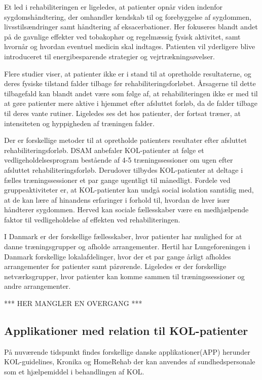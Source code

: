 Et led i rehabiliteringen er ligeledes, at patienter opnår viden indenfor sygdomshåndtering, der omhandler kendskab til og forebyggelse af sygdommen, livsstilsændringer samt håndtering af eksacerbationer.\cite{McCarthy2015,Sundhedsstyrelsen2015} Her fokuseres blandt andet på de gavnlige effekter ved tobakophør og regelmæssig fysisk aktivitet, samt hvornår og hvordan eventuel medicin skal indtages. Patienten vil yderligere blive introduceret til energibesparende strategier og vejrtrækningsøvelser. \cite{McCarthy2015,Sundhedsstyrelsen2015}    

Flere studier viser, at patienter ikke er i stand til at opretholde resultaterne, og deres fysiske tilstand falder tilbage før rehabiliteringsforløbet.\cite{Egan2012,Beachamp2013,Zanaboni2017,Ringbaek2008} 
Årsagerne til dette tilbagefald kan blandt andet være som følge af, at rehabiliteringen ikke er med til at gøre patienter mere aktive i hjemmet efter afsluttet forløb, da de falder tilbage til deres vante rutiner. \cite{Egan2012} Ligeledes ses det hos patienter, der fortsat træner, at intensiteten og hyppigheden af træningen falder. \cite{Ringbaek2008} 


Der er forskellige metoder til at opretholde patienters resultater efter afsluttet rehabiliteringsforløb. DSAM anbefaler KOL-patienter at følge et vedligeholdelsesprogram bestående af 4-5 træningssessioner om ugen efter afsluttet rehabiliteringsforløb. Derudover tilbydes  KOL-patienter at deltage i fælles træningssessioner et par gange ugentligt til månedligt. \cite{dsam2016}
Fordele ved gruppeaktiviteter er, at KOL-patienter kan undgå social isolation samtidig med, at de kan lære af hinandens erfaringer i forhold til, hvordan de hver især håndterer sygdommen. Herved kan sociale fællesskaber være en medhjælpende faktor til vedligeholdelse af effekten ved rehabiliteringen.  \cite{dsam2016} 

I Danmark er der forskellige fællesskaber, hvor patienter har mulighed for at danne træningsgrupper og afholde arrangementer. \cite{Sundhedsstyrrelsen2015} Hertil har Lungeforeningen i Danmark forskellige lokalafdelinger, hvor der et par gange årligt afholdes arrangementer for patienter samt pårørende. Ligeledes er der forskellige netværksgrupper, hvor patienter kan komme sammen til træningssessioner og andre arrangementer. \cite{Lungeforeningen2016}

*** HER MANGLER EN OVERGANG ***

\subsection{Applikationer med relation til KOL-patienter}
På nuværende tidspunkt findes forskellige danske applikationer(APP) herunder KOL-guidelines, Kronika og HomeRehab der kan anvendes af sundhedspersonale som et hjælpemiddel i behandlingen af KOL. 


